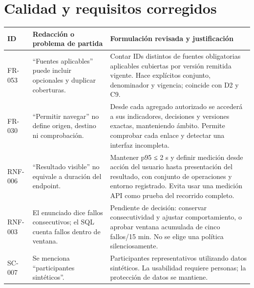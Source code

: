 \documentclass[12pt,a4paper]{report}
\begin{document}
\section{Calidad y requisitos
corregidos}\label{calidad-y-requisitos-corregidos}

{\def\LTcaptype{none} %
\begin{longtable}[]{@{}
  >{\raggedright\arraybackslash}p{}
  >{\raggedright\arraybackslash}p{}
  >{\raggedright\arraybackslash}p{}@{}}
\toprule\noalign{}
\begin{minipage}[b]{\linewidth}\raggedright
ID
\end{minipage} & \begin{minipage}[b]{\linewidth}\raggedright
Redacción o problema de partida
\end{minipage} & \begin{minipage}[b]{\linewidth}\raggedright
Formulación revisada y justificación
\end{minipage} \\
\midrule\noalign{}
\endhead
\bottomrule\noalign{}
\endlastfoot
FR-053 & ``Fuentes aplicables'' puede incluir opcionales y duplicar
coberturas. & Contar IDs distintos de fuentes obligatorias aplicables
cubiertas por versión remitida vigente. Hace explícitos conjunto,
denominador y vigencia; coincide con D2 y C9. \\
FR-030 & ``Permitir navegar'' no define origen, destino ni comprobación.
& Desde cada agregado autorizado se accederá a sus indicadores,
decisiones y versiones exactas, manteniendo ámbito. Permite comprobar
cada enlace y detectar una interfaz incompleta. \\
RNF-006 & ``Resultado visible'' no equivale a duración del endpoint. &
Mantener p95 ≤ 2 s y definir medición desde acción del usuario hasta
presentación del resultado, con conjunto de operaciones y entorno
registrado. Evita usar una medición API como prueba del recorrido
completo. \\
RNF-003 & El enunciado dice fallos consecutivos; el SQL cuenta fallos
dentro de ventana. & Pendiente de decisión: conservar consecutividad y
ajustar comportamiento, o aprobar ventana acumulada de cinco fallos/15
min. No se elige una política silenciosamente. \\
SC-007 & Se menciona ``participantes sintéticos''. & Participantes
representativos utilizando datos sintéticos. La usabilidad requiere
personas; la protección de datos se mantiene. \\
\end{longtable}
}
\end{document}

